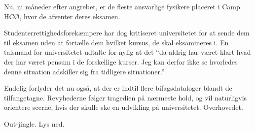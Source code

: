 \documentclass[a4paper]{article}
\begin{document}
\begin{sketch}
Nu, ni måneder efter angrebet, er de fleste ansvarlige fysikere
placeret i Camp HCØ, hvor de afventer deres eksamen.


Studenterrettighedsforekæmpere har dog kritiseret
universitetet for at sende dem til eksamen uden at fortælle dem
hvilket kursus, de skal eksamineres i.
En talsmand for universitetet udtalte for nylig at det
``da aldrig har været klart hvad der har været pensum i de forskellige
kurser.  Jeg kan derfor ikke se hvorledes denne situation adskiller
sig fra tidligere situationer.''

Endelig forlyder det nu også, at der er indtil flere bifagsdataloger
blandt de tilfangetagne. Revyhederne følger tragedien på nærmeste hold,
og vil naturligvis orientere seerne, hvis der skulle ske
en udvikling på universitetet. Overhovedet.

\scene Out-jingle. Lys ned.

\end{sketch}
\end{document}
